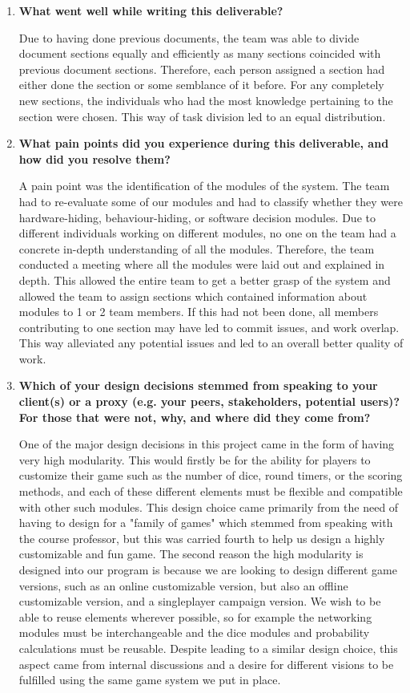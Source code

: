 \documentclass[12pt, titlepage]{article}
\begin{document}
\begin{enumerate}
  \item \textbf{What went well while writing this deliverable?} 
  
  Due to having done previous documents, the team was able to divide document sections equally and efficiently as many sections coincided with previous document sections. Therefore, each person assigned a section had either done the section or some semblance of it before. For any completely new sections, the individuals who had the most knowledge pertaining to the section were chosen. This way of task division led to an equal distribution.

  \item \textbf{What pain points did you experience during this deliverable, and how did you resolve them?}

  A pain point was the identification of the modules of the system. The team had to re-evaluate some of our modules and had to classify whether they were hardware-hiding, behaviour-hiding, or software decision modules.  Due to different individuals working on different modules, no one on the team had a concrete in-depth understanding of all the modules. Therefore, the team conducted a meeting where all the modules were laid out and explained in depth. This allowed the entire team to get a better grasp of the system and allowed the team to assign sections which contained information about modules to 1 or 2 team members. If this had not been done, all members contributing to one section may have led to commit issues, and work overlap.  This way alleviated any potential issues and led to an overall better quality of work.

  \item \textbf{Which of your design decisions stemmed from speaking to your client(s)
  or a proxy (e.g. your peers, stakeholders, potential users)? For those that
  were not, why, and where did they come from?}
  
One of the major design decisions in this project came in the form of having very high modularity. This would firstly be for the ability for players to customize their game such as the number of dice, round timers, or the scoring methods, and each of these different elements must be flexible and compatible with other such modules. This design choice came primarily from the need of having to design for a "family of games" which stemmed from speaking with the course professor, but this was carried fourth to help us design a highly customizable and fun game. The second reason the high modularity is designed into our program is because we are looking to design different game versions, such as an online customizable version, but also an offline customizable version, and a singleplayer campaign version. We wish to be able to reuse elements wherever possible, so for example the networking modules must be interchangeable and the dice modules and probability calculations must be reusable. Despite leading to a similar design choice, this aspect came from internal discussions and a desire for different visions to be fulfilled using the same game system we put in place.
  

\end{enumerate}
\end{document}
